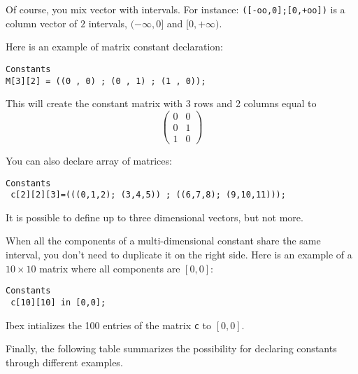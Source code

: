 Of course, you mix vector with intervals. For instance:
{\tt ([-oo,0];[0,+oo])} is a column vector of $2$ intervals, $(-\infty,0]$ and $[0,+\infty)$.

Here is an example of matrix constant declaration: %
\begin{verbatim}
Constants
M[3][2] = ((0 , 0) ; (0 , 1) ; (1 , 0));
\end{verbatim}
This will create the constant matrix  with 3 rows and 2 columns equal to
$$\begin{pmatrix}
0 & 0 \\ 0 & 1 \\ 1 & 0
\end{pmatrix}$$

You can also declare array of matrices:
\begin{verbatim}
Constants
 c[2][2][3]=(((0,1,2); (3,4,5)) ; ((6,7,8); (9,10,11)));
\end{verbatim}
It is possible to define up to three dimensional vectors, but not more.

When all the components of a multi-dimensional constant share the same interval, you
don't need to duplicate it on the right side. Here is an example of a $10\times10$ matrix where all
components are $[0,0]$:
\begin{verbatim}
Constants
 c[10][10] in [0,0];
\end{verbatim}
Ibex intializes the 100 entries of the matrix {\tt c} to $[0,0]$.

Finally, the following table summarizes the possibility for declaring constants
through different examples.

